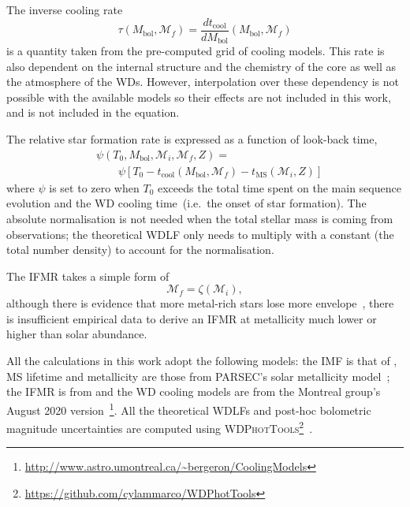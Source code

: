 \documentclass[fleqn,usenatbib]{mnras}
\begin{document}
The inverse cooling rate
\begin{equation}
    \tau(M_\mathrm{bol}, \mathcal{M}_f) = \dfrac{dt_{\mathrm{cool}}}{dM_\mathrm{bol}} \left( M_\mathrm{bol}, \mathcal{M}_f \right)
\end{equation}
is a quantity taken from the pre-computed grid of cooling models. This rate is
also dependent on the internal structure and the chemistry of the core as well
as the atmosphere of the WDs. However, interpolation over these dependency is
not possible with the available models so their effects are not included in
this work, and is not included in the equation.

The relative star formation rate is expressed as a function of look-back time,
\begin{align}
    &\psi(T_0, M_\mathrm{bol}, \mathcal{M}_i, \mathcal{M}_f, Z) =\\
    &\qquad\psi\left[T_0 - t_{\mathrm{cool}}\left(M_\mathrm{bol}, \mathcal{M}_f\right) - t_{\mathrm{MS}}\left(\mathcal{M}_i, Z\right)\right]
\end{align}
where $\psi$ is set to zero when $T_{0}$ exceeds the total time spent on the
main sequence evolution and the WD cooling time~(i.e.\ the onset of star 
formation). The absolute normalisation is not needed when the total stellar
mass is coming from observations; the theoretical WDLF only needs to multiply
with a constant (the total number density) to account for the normalisation.

The IFMR takes a simple form of
\begin{equation}
    \mathcal{M}_f = \zeta(\mathcal{M}_i),
\end{equation}
although there is evidence that more metal-rich stars lose more
envelope~\citep{2007ApJ...671..761K}, there is insufficient empirical data
to derive an IFMR at metallicity much lower or higher than solar abundance.

All the calculations in this work adopt the following models: the IMF is that of
\citet{2003PASP..115..763C}, MS lifetime and metallicity are those from
PARSEC's solar metallicity model~\citep[Z=0.017, Y=0.279;][]{2012MNRAS.427..127B}; the IFMR is
from \citet{2008MNRAS.387.1693C} and the WD cooling models are from the
Montreal group's August 2020 version~\citep{2020ApJ...901...93B}\footnote{\url{http://www.astro.umontreal.ca/~bergeron/CoolingModels}}.
All the theoretical WDLFs and post-hoc bolometric magnitude uncertainties are
computed using \textsc{WDPhotTools}\footnote{\url{https://github.com/cylammarco/WDPhotTools}}~\citep{marco_c_lam_2022_6595029, 
2022RASTI...1...81L}.
\end{document}
